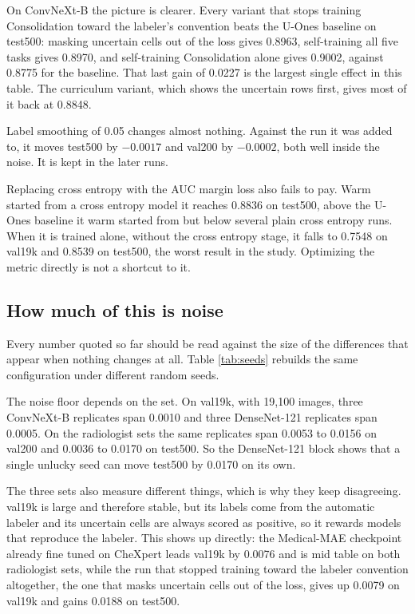 \documentclass{article}
\begin{document}
On ConvNeXt-B the picture is clearer. Every variant that stops training Consolidation
toward the labeler's convention beats the U-Ones baseline on test500: masking uncertain
cells out of the loss gives 0.8963, self-training all five tasks gives 0.8970, and
self-training Consolidation alone gives 0.9002, against 0.8775 for the baseline. That
last gain of 0.0227 is the largest single effect in this table. The curriculum variant,
which shows the uncertain rows first, gives most of it back at 0.8848.

Label smoothing of 0.05 changes almost nothing. Against the run it was added to, it
moves test500 by $-0.0017$ and val200 by $-0.0002$, both well inside the noise. It is
kept in the later runs.

Replacing cross entropy with the AUC margin loss also fails to pay. Warm started from a
cross entropy model it reaches 0.8836 on test500, above the U-Ones baseline it warm
started from but below several plain cross entropy runs. When it is trained alone,
without the cross entropy stage, it falls to 0.7548 on val19k and 0.8539 on test500, the
worst result in the study. Optimizing the metric directly is not a shortcut to it.



\subsection{How much of this is noise}
\label{sec:results-noise}
\label{sec:results-seed}
\label{sec:results-valsize}

Every number quoted so far should be read against the size of the differences that
appear when nothing changes at all. Table \ref{tab:seeds} rebuilds the same
configuration under different random seeds.

The noise floor depends on the set. On val19k, with 19,100 images, three ConvNeXt-B
replicates span 0.0010 and three DenseNet-121 replicates span 0.0005. On the
radiologist sets the same replicates span 0.0053 to 0.0156 on val200 and 0.0036 to
0.0170 on test500. So the DenseNet-121 block shows that a single unlucky seed can
move test500 by 0.0170 on its own.

The three sets also measure different things, which is why they keep disagreeing.
val19k is large and therefore stable, but its labels come from the automatic labeler
and its uncertain cells are always scored as positive, so it rewards models that
reproduce the labeler. This shows up directly: the Medical-MAE checkpoint already fine
tuned on CheXpert leads val19k by 0.0076 and is mid table on both radiologist sets,
while the run that stopped training toward the labeler convention altogether, the one
that masks uncertain cells out of the loss, gives up 0.0079 on val19k and gains 0.0188
on test500.
\end{document}
